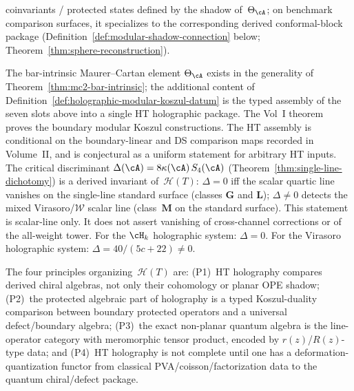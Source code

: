 \begin{definition}
\begin{enumerate}[label=\textup{(\roman*)}]
 coinvariants / protected states defined by the shadow of~$\Theta_\cA$;
 on benchmark comparison surfaces, it specializes to the
 corresponding derived conformal-block package
 \textup{(}Definition~\ref{def:modular-shadow-connection} below;
 Theorem~\ref{thm:sphere-reconstruction}\textup{)}.
\end{enumerate}
The bar-intrinsic Maurer--Cartan element $\Theta_\cA$ exists in the
generality of Theorem~\ref{thm:mc2-bar-intrinsic}; the additional
content of Definition~\ref{def:holographic-modular-koszul-datum} is the
typed assembly of the seven slots above into a single HT holographic
package. The Vol~I theorem proves the boundary modular Koszul
constructions. The HT assembly is conditional on the boundary-linear
and DS comparison maps recorded in Volume~II, and is conjectural as a
uniform statement for arbitrary HT inputs.
The critical discriminant $\Delta(\cA) = 8\kappa(\cA)\,S_4(\cA)$
(Theorem~\ref{thm:single-line-dichotomy}) is a derived invariant
of~$\mathcal{H}(T)$:
$\Delta = 0$ iff the scalar quartic line vanishes on the
single-line standard surface (classes $\mathbf{G}$ and $\mathbf{L}$);
$\Delta \neq 0$ detects the mixed Virasoro/$\mathcal W$ scalar line
(class~$\mathbf{M}$ on the standard surface). This statement is
scalar-line only. It does not assert vanishing of cross-channel
corrections or of the all-weight tower.
For the $\cH_k$ holographic system: $\Delta = 0$.
For the Virasoro holographic system:
$\Delta = 40/(5c{+}22) \neq 0$.

The four principles organizing~$\mathcal{H}(T)$ are:
\textup{(P1)}~HT holography compares derived chiral algebras, not only
their cohomology or planar OPE shadow;
\textup{(P2)}~the protected algebraic part of holography is a typed
Koszul-duality comparison between boundary protected operators and a
universal defect/boundary algebra;
\textup{(P3)}~the exact non-planar quantum algebra is the line-operator
category with meromorphic tensor product, encoded by $r(z)$/$R(z)$-type
data; and
\textup{(P4)}~HT holography is not complete until one has a
deformation-quantization functor from classical PVA/coisson/factorization
data to the quantum chiral/defect package.
\end{definition}

